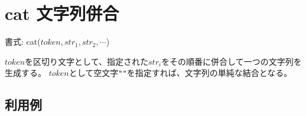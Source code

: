 
%

\section{cat 文字列併合\label{sect:cat}}

書式: cat($token,str_1,str_2,\cdots$)

$token$を区切り文字として、指定された$str_i$をその順番に併合して一つの文字列を生成する。
$token$として空文字\verb|""|を指定すれば、文字列の単純な結合となる。

\subsection*{利用例}


%

